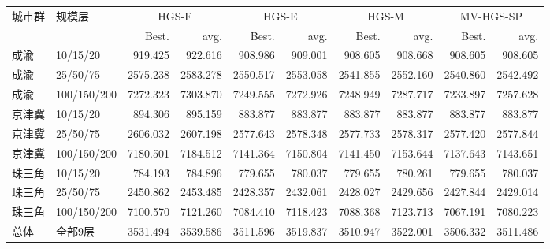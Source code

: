 \begin{tabular}{@{}llrrrrrrrr@{}}
\toprule
城市群 & 规模层 & \multicolumn{2}{c}{HGS-F} & \multicolumn{2}{c}{HGS-E} & \multicolumn{2}{c}{HGS-M} & \multicolumn{2}{c}{MV-HGS-SP}\\
 &  & Best. & avg. & Best. & avg. & Best. & avg. & Best. & avg.\\
\midrule
成渝 & 10/15/20 & 919.425 & 922.616 & 908.986 & 909.001 & 908.605 & 908.668 & 908.605 & 908.605 \\
成渝 & 25/50/75 & 2575.238 & 2583.278 & 2550.517 & 2553.058 & 2541.855 & 2552.160 & 2540.860 & 2542.492 \\
成渝 & 100/150/200 & 7272.323 & 7303.870 & 7249.555 & 7272.926 & 7248.949 & 7287.717 & 7233.897 & 7257.628 \\
京津冀 & 10/15/20 & 894.306 & 895.159 & 883.877 & 883.877 & 883.877 & 883.877 & 883.877 & 883.877 \\
京津冀 & 25/50/75 & 2606.032 & 2607.198 & 2577.643 & 2578.348 & 2577.733 & 2578.317 & 2577.420 & 2577.844 \\
京津冀 & 100/150/200 & 7180.501 & 7184.512 & 7141.364 & 7150.804 & 7141.450 & 7153.644 & 7137.643 & 7143.651 \\
珠三角 & 10/15/20 & 784.193 & 784.896 & 779.655 & 780.037 & 779.655 & 780.261 & 779.655 & 780.037 \\
珠三角 & 25/50/75 & 2450.862 & 2453.485 & 2428.357 & 2432.061 & 2428.027 & 2429.656 & 2427.844 & 2429.014 \\
珠三角 & 100/150/200 & 7100.570 & 7121.260 & 7084.410 & 7118.423 & 7088.368 & 7123.713 & 7067.191 & 7080.223 \\
总体 & 全部9层 & 3531.494 & 3539.586 & 3511.596 & 3519.837 & 3510.947 & 3522.001 & 3506.332 & 3511.486 \\
\bottomrule
\end{tabular}
